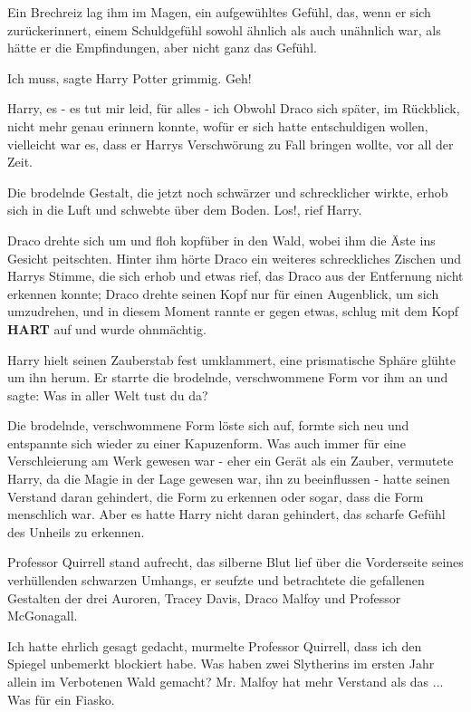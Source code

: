Ein Brechreiz lag ihm im Magen, ein aufgewühltes Gefühl, das, wenn er sich
zurückerinnert, einem Schuldgefühl sowohl ähnlich als auch unähnlich war,
als hätte er die Empfindungen, aber nicht ganz das Gefühl.

\glqq{}Ich muss\grqq{}, sagte Harry Potter grimmig. \glqq{}Geh!\grqq{}

\glqq{}Harry, es - es tut mir leid, für alles - ich\grqq{} Obwohl Draco sich
später, im Rückblick, nicht mehr genau erinnern konnte, wofür er sich
hatte entschuldigen wollen, vielleicht war es, dass er Harrys
Verschwörung zu Fall bringen wollte, vor all der Zeit.

Die brodelnde Gestalt, die jetzt noch schwärzer und schrecklicher wirkte, erhob
sich in die Luft und schwebte über dem Boden. \glqq{}Los!\grqq{}, rief
Harry.

Draco drehte sich um und floh kopfüber in den Wald, wobei ihm die Äste ins
Gesicht peitschten. Hinter ihm hörte Draco ein weiteres schreckliches
Zischen und Harrys Stimme, die sich erhob und etwas rief, das Draco aus
der Entfernung nicht erkennen konnte; Draco drehte seinen Kopf nur für
einen Augenblick, um sich umzudrehen, und in diesem Moment rannte er
gegen etwas, schlug mit dem Kopf \textbf{HART} auf und wurde ohnmächtig.

Harry hielt seinen Zauberstab fest umklammert, eine prismatische Sphäre glühte
um ihn herum. Er starrte die brodelnde, verschwommene Form vor ihm an und
sagte: \glqq{}Was in aller Welt tust du da?\grqq{}

Die brodelnde, verschwommene Form löste sich auf, formte sich neu und entspannte
sich wieder zu einer Kapuzenform. Was auch immer für eine Verschleierung
am Werk gewesen war - eher ein Gerät als ein Zauber, vermutete Harry, da
die Magie in der Lage gewesen war, ihn zu beeinflussen - hatte seinen
Verstand daran gehindert, die Form zu erkennen oder sogar, dass die Form
menschlich war. Aber es hatte Harry nicht daran gehindert, das scharfe
Gefühl des Unheils zu erkennen.

Professor Quirrell stand aufrecht, das silberne Blut lief über die Vorderseite
seines verhüllenden schwarzen Umhangs, er seufzte und betrachtete die
gefallenen Gestalten der drei Auroren, Tracey Davis, Draco Malfoy und
Professor McGonagall.

\glqq{}Ich hatte ehrlich gesagt gedacht\grqq{}, murmelte Professor Quirrell,
\glqq{}dass ich den Spiegel unbemerkt blockiert habe. Was haben zwei
Slytherins im ersten Jahr allein im Verbotenen Wald gemacht? Mr. Malfoy
hat mehr Verstand als das ... Was für ein Fiasko.\grqq{}

